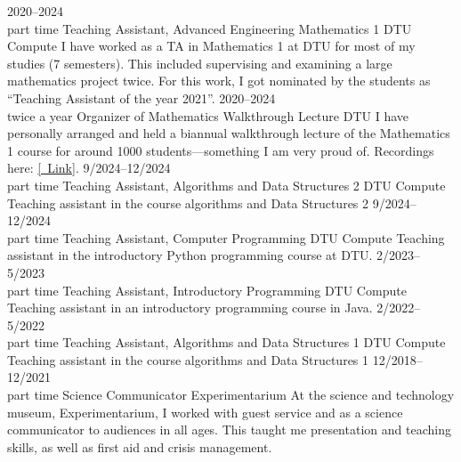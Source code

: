 \documentclass[9pt]{developercv} %
\begin{document}
\begin{entrylist}
	\entry%
		{2020--2024\\\footnotesize{part time}}
		{Teaching Assistant, Advanced Engineering Mathematics 1}
		{DTU Compute}
		{I have worked as a TA in Mathematics 1 at DTU for most of my studies (7 semesters). This included supervising and examining a large mathematics project twice. For this work, I got nominated by the students as ``Teaching Assistant of the year 2021''. }
	\entry%
		{2020--2024\\\footnotesize{twice a year}}
		{Organizer of Mathematics Walkthrough Lecture}
		{DTU}
		{I have personally arranged and held a biannual walkthrough lecture of the Mathematics 1 course for around 1000 students---something I am very proud of. Recordings here: \href{https://www.youtube.com/@jonathanhjlev3240/videos}{[\faYoutubePlay\ Link]}.}
	\entry%
		{9/2024--12/2024\\\footnotesize{part time}}
		{Teaching Assistant, Algorithms and Data Structures 2}
		{DTU Compute}
		{Teaching assistant in the course algorithms and Data Structures 2}
	\entry%
		{9/2024--12/2024\\\footnotesize{part time}}
		{Teaching Assistant, Computer Programming}
		{DTU Compute}
		{Teaching assistant in the introductory Python programming course at DTU.}
	\entry%
		{2/2023--5/2023\\\footnotesize{part time}}
		{Teaching Assistant, Introductory Programming}
		{DTU Compute}
		{Teaching assistant in an introductory programming course in Java.}
    \entry%
		{2/2022--5/2022\\\footnotesize{part time}}
		{Teaching Assistant, Algorithms and Data Structures 1}
		{DTU Compute}
		{Teaching assistant in the course algorithms and Data Structures 1}
	\entry%
		{12/2018--12/2021\\\footnotesize{part time}}
		{Science Communicator}
		{Experimentarium}
		{At the science and technology museum, Experimentarium, I worked with guest service and as a science communicator to audiences in all ages. This taught me presentation and teaching skills, as well as first aid and crisis management.}
	\end{entrylist}


\end{document}
